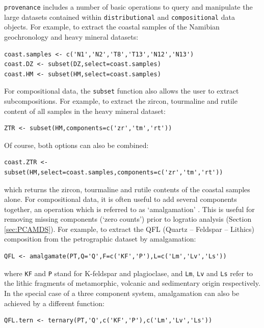 \documentclass{article}
\begin{document}
{\tt provenance} includes a number of basic operations to query and
manipulate the large datasets contained within {\tt distributional}
and {\tt compositional} data objects. For example, to extract the
coastal samples of the Namibian geochronology and heavy mineral
datasets:

\begin{verbatim}
coast.samples <- c('N1','N2','T8','T13','N12','N13')
coast.DZ <- subset(DZ,select=coast.samples)
coast.HM <- subset(HM,select=coast.samples)
\end{verbatim}

For compositional data, the {\tt subset} function also allows the
user to extract subcompositions. For example, to extract the zircon,
tourmaline and rutile content of all samples in the heavy mineral
dataset:

\begin{verbatim}
ZTR <- subset(HM,components=c('zr','tm','rt'))
\end{verbatim}

Of course, both options can also be combined:

\begin{verbatim}
coast.ZTR <- subset(HM,select=coast.samples,components=c('zr','tm','rt'))
\end{verbatim}

which returns the zircon, tourmaline and rutile contents of the
coastal samples alone. For compositional data, it is often useful to
add several components together, an operation which is referred to as
`amalgamation' \citep{aitchison1986}.  This is useful for removing
missing components (`zero counts') prior to logratio analysis (Section
\ref{sec:PCAMDS}). For example, to extract the QFL (Quartz -- Feldspar
-- Lithics) composition from the petrographic dataset by amalgamation:

\begin{verbatim}
QFL <- amalgamate(PT,Q='Q',F=c('KF','P'),L=c('Lm','Lv','Ls'))
\end{verbatim}

where {\tt KF} and {\tt P} stand for K-feldspar and plagioclase, and
{\tt Lm}, {\tt Lv} and {\tt Ls} refer to the lithic fragments of
metamorphic, volcanic and sedimentary origin respectively. In the
special case of a three component system, amalgamation can also be
achieved by a different function:

\begin{verbatim}
QFL.tern <- ternary(PT,'Q',c('KF','P'),c('Lm','Lv','Ls'))
\end{verbatim}
\end{document}
